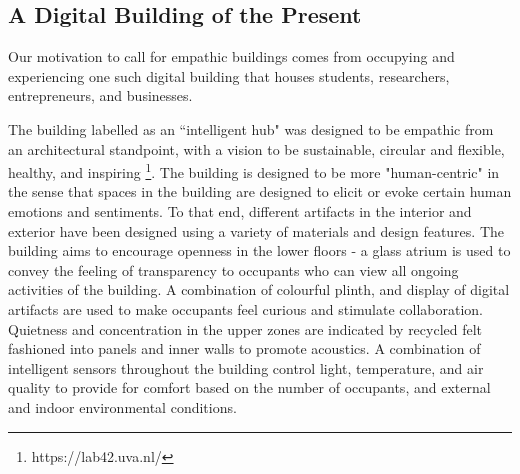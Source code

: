 \documentclass[manuscript, anonymous, review]{acmart}
\begin{document}

\subsection{A Digital Building of the Present}
\label{subsec:building}
Our motivation to call for empathic buildings comes from occupying and experiencing one such digital building that houses students, researchers, entrepreneurs, and businesses.

The building labelled as an ``intelligent hub" was designed to be empathic from an architectural standpoint, with a vision to be sustainable, circular and flexible, healthy, and inspiring \footnote{https://lab42.uva.nl/}. The building is designed to be more "human-centric" in the sense that spaces in the building are designed to elicit or evoke certain human emotions and sentiments. To that end, different artifacts in the interior and exterior have been designed using a variety of materials and design features. The building aims to encourage openness in the lower floors - a glass atrium is used to convey the feeling of transparency to occupants who can view all ongoing activities of the building.  A combination of colourful plinth, and display of digital artifacts are used to make occupants feel curious and stimulate collaboration. Quietness and concentration in the upper zones are indicated by recycled felt fashioned into panels and inner walls to promote acoustics. A combination of intelligent sensors throughout the building control light, temperature, and air quality to provide for comfort based on the number of occupants, and external and indoor environmental conditions.
\end{document}
